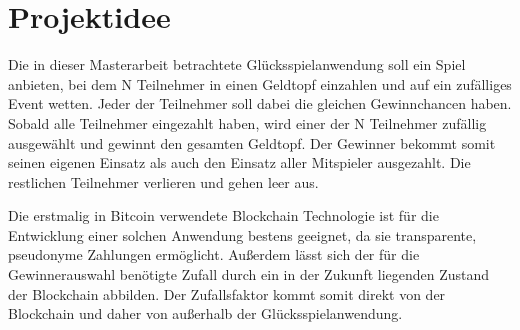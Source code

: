 





\section{Projektidee}

Die in dieser Masterarbeit betrachtete Glücksspielanwendung soll ein Spiel anbieten, bei dem N Teilnehmer in einen Geldtopf einzahlen und auf ein zufälliges Event wetten. Jeder der Teilnehmer soll dabei die gleichen Gewinnchancen haben. Sobald alle Teilnehmer eingezahlt haben, wird einer der N Teilnehmer zufällig ausgewählt und gewinnt den gesamten Geldtopf. Der Gewinner bekommt somit seinen eigenen Einsatz als auch den Einsatz aller Mitspieler ausgezahlt. Die restlichen Teilnehmer verlieren und gehen leer aus.

Die erstmalig in Bitcoin verwendete Blockchain Technologie ist für die Entwicklung einer solchen Anwendung bestens geeignet, da sie transparente, pseudonyme Zahlungen ermöglicht. Außerdem lässt sich der für die Gewinnerauswahl benötigte Zufall durch ein in der Zukunft liegenden Zustand der Blockchain abbilden. 
Der Zufallsfaktor kommt somit direkt von der Blockchain und daher von außerhalb der Glücksspielanwendung.

